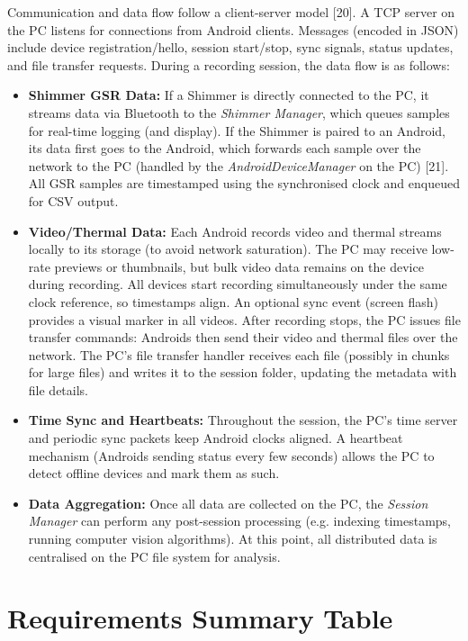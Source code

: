 Communication and data flow follow a client-server model [20]. A TCP server on the PC listens for connections from Android clients. Messages (encoded in JSON) include device registration/hello, session start/stop, sync signals, status updates, and file transfer requests. During a recording session, the data flow is as follows:
\begin{itemize}
    \item \textbf{Shimmer GSR Data:} If a Shimmer is directly connected to the PC, it streams data via Bluetooth to the \textit{Shimmer Manager}, which queues samples for real-time logging (and display). If the Shimmer is paired to an Android, its data first goes to the Android, which forwards each sample over the network to the PC (handled by the \textit{AndroidDeviceManager} on the PC) [21]. All GSR samples are timestamped using the synchronised clock and enqueued for CSV output.
    \item \textbf{Video/Thermal Data:} Each Android records video and thermal streams locally to its storage (to avoid network saturation). The PC may receive low-rate previews or thumbnails, but bulk video data remains on the device during recording. All devices start recording simultaneously under the same clock reference, so timestamps align. An optional sync event (screen flash) provides a visual marker in all videos. After recording stops, the PC issues file transfer commands: Androids then send their video and thermal files over the network. The PC’s file transfer handler receives each file (possibly in chunks for large files) and writes it to the session folder, updating the metadata with file details.
    \item \textbf{Time Sync and Heartbeats:} Throughout the session, the PC’s time server and periodic sync packets keep Android clocks aligned. A heartbeat mechanism (Androids sending status every few seconds) allows the PC to detect offline devices and mark them as such.
    \item \textbf{Data Aggregation:} Once all data are collected on the PC, the \textit{Session Manager} can perform any post-session processing (e.g. indexing timestamps, running computer vision algorithms). At this point, all distributed data is centralised on the PC file system for analysis.
\end{itemize}


\section{Requirements Summary Table}

